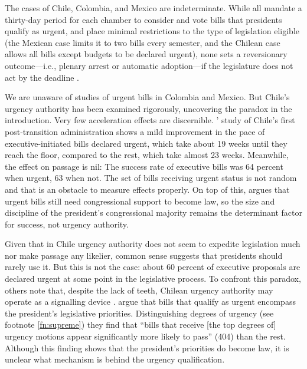 \documentclass[letter,12pt]{article}
\begin{document}
The cases of Chile, Colombia, and Mexico are indeterminate. While all mandate a thirty-day period for each chamber to consider and vote bills that presidents qualify as urgent, and place minimal restrictions to the type of legislation eligible (the Mexican case limits it to two bills every semester, and the Chilean case allows all bills except budgets to be declared urgent), none sets a reversionary outcome---i.e., plenary arrest or automatic adoption---if the legislature does not act by the deadline \citep{nolte.2003,sotoCongChile2015,carroll-pachon.2016,magar.2014-refConst}.

We are unaware of studies of urgent bills in Colombia and Mexico. But Chile's urgency authority has been examined rigorously, uncovering the paradox in the introduction. Very few acceleration effects are discernible. \citeauthor{siavelis.2002}' \citeyearpar{siavelis.2002} study of Chile's first post-transition administration shows a mild improvement in the pace of executive-initiated bills declared urgent, which take about 19 weeks until they reach the floor, compared to the rest, which take almost 23 weeks. Meanwhile, the effect on passage is nil: The success rate of executive bills was 64 percent when urgent, 63 when not. The set of bills receiving urgent status is not random and that is an obstacle to measure effects properly. On top of this, \citet[][:51]{nolte.2003} argues that urgent bills still need congressional support to become law, so the size and discipline of the president's congressional majority remains the determinant factor for success, not urgency authority. 

Given that in Chile urgency authority does not seem to expedite legislation much nor make passage any likelier, common sense suggests that presidents should rarely use it. But this is not the case: about 60 percent of executive proposals are declared urgent at some point in the legislative process. To confront this paradox, others note that, despite the lack of teeth, Chilean urgency authority may operate as a signalling device \citep{berrios.gamboa.fiscChile.2006,aninat.exagCoop2006}. \citet{aleman.navia.UrgChi.2009} argue that bills that qualify as urgent encompass the president's legislative priorities. Distinguishing degrees of urgency (see footnote \ref{fn:supreme}) they find that ``bills that receive [the top degrees of] urgency motions appear significantly more likely to pass'' (404) than the rest. Although this finding shows that the president's priorities do become law, it is unclear what mechanism is behind the urgency qualification.
\end{document}
